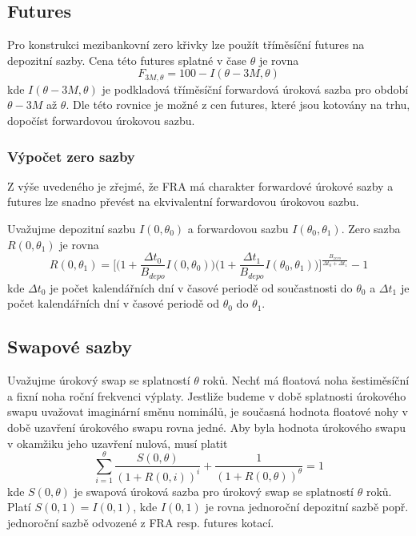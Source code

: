 \documentclass[a4paper]{book}
\begin{document}
\subsection{Futures}

Pro konstrukci mezibankovní zero křivky lze použít tříměsíční futures na depozitní sazby. Cena této futures splatné v čase $\theta$ je rovna
\begin{equation*}
F_{3M,\theta} = 100 - I(\theta - 3M, \theta)
\end{equation*}
kde $I(\theta - 3M, \theta)$ je podkladová tříměsíční forwardová úroková sazba pro období $\theta - 3M$ až $\theta$. Dle této rovnice je možné z cen futures, které jsou kotovány na trhu, dopočíst forwardovou úrokovou sazbu.

\subsubsection{Výpočet zero sazby}

Z výše uvedeného je zřejmé, že FRA má charakter forwardové úrokové sazby a futures lze snadno převést na ekvivalentní forwardovou úrokovou sazbu.

Uvažujme depozitní sazbu $I(0, \theta_0)$ a forwardovou sazbu $I(\theta_0, \theta_1)$. Zero sazba $R(0, \theta_1)$ je rovna
\begin{equation*}
R(0,\theta_1) = \Bigg[ \Big( 1 + \frac{\Delta t_0}{B_{depo}}I(0,\theta_0)\Big) \Big( 1 + \frac{\Delta t_1}{B_{depo}} I(\theta_0, \theta_1) \Big)\Bigg]^{\frac{B_{zero}}{\Delta t_0 + \Delta t_1}} - 1
\end{equation*}
kde $\Delta t_0$ je počet kalendářních dní v časové periodě od součastnosti do $\theta_0$ a $\Delta t_1$ je počet kalendářních dní v časové periodě od $\theta_0$ do $\theta_1$.

\subsection{Swapové sazby}

Uvažujme úrokový swap se splatností $\theta$ roků. Nechť má floatová noha šestiměsíční a fixní noha roční frekvenci výplaty. Jestliže budeme v době splatnosti úrokového swapu uvažovat imaginární směnu nominálů, je současná hodnota floatové nohy v době uzavření úrokového swapu rovna jedné. Aby byla hodnota úrokového swapu v okamžiku jeho uzavření nulová, musí platit
\begin{equation*}
\sum_{i = 1}^{\theta} \frac{S(0,\theta)}{(1 + R(0,i))^i} + \frac{1}{(1 + R(0,\theta))^{\theta}} = 1
\end{equation*} 
kde $S(0,\theta)$ je swapová úroková sazba pro úrokový swap se splatností $\theta$ roků. Platí $S(0,1) = I(0,1)$, kde $I(0,1)$ je rovna jednoroční depozitní sazbě popř. jednoroční sazbě odvozené z FRA resp. futures kotací.
\end{document}
